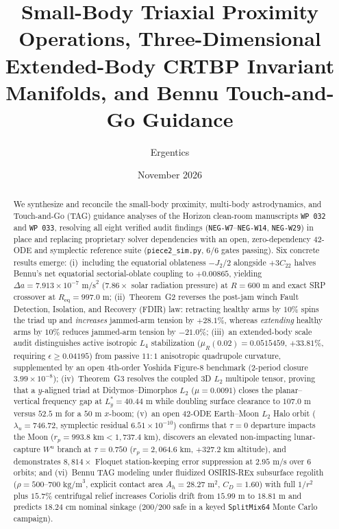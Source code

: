 \documentclass[11pt]{amsart}
\title[Small-Body Proximity, CRTBP Manifolds, and TAG Guidance]{Small-Body Triaxial Proximity Operations, Three-Dimensional Extended-Body CRTBP Invariant Manifolds, and Bennu Touch-and-Go Guidance}
\author{Ergentics}
\date{November 2026}
\numberwithin{equation}{section}
\theoremstyle{plain}
\theoremstyle{definition}\newtheorem{definition}[theorem]{Definition}
\theoremstyle{remark}\newtheorem{remark}[theorem]{Remark}
\begin{document}
\begin{abstract}
We synthesize and reconcile the small-body proximity, multi-body astrodynamics, and Touch-and-Go (TAG) guidance analyses of the Horizon clean-room manuscripts \texttt{WP~032} and \texttt{WP~033}, resolving all eight verified audit findings (\texttt{NEG-W7}--\texttt{NEG-W14}, \texttt{NEG-W29}) in place and replacing proprietary solver dependencies with an open, zero-dependency 42-ODE and symplectic reference suite (\texttt{piece2\_sim.py}, 6/6 gates passing). Six concrete results emerge: (i)~including the equatorial oblateness $-J_2/2$ alongside $+3C_{22}$ halves Bennu's net equatorial sectorial-oblate coupling to $+0.00865$, yielding $\Delta a = 7.913\times 10^{-7}\text{ m/s}^2$ ($7.86\times$ solar radiation pressure) at $R = 600\text{ m}$ and exact SRP crossover at $R_{\mathrm{eq}} = 997.0\text{ m}$; (ii)~Theorem~G2 reverses the post-jam winch Fault Detection, Isolation, and Recovery (FDIR) law: retracting healthy arms by $10\%$ spins the triad up and \emph{increases} jammed-arm tension by $+28.1\%$, whereas \emph{extending} healthy arms by $10\%$ reduces jammed-arm tension by $-21.0\%$; (iii)~an extended-body scale audit distinguishes active isotropic $L_4$ stabilization ($\mu_R(0.02) = 0.0515459$, $+33.81\%$, requiring $\epsilon \ge 0.04195$) from passive $11:1$ anisotropic quadrupole curvature, supplemented by an open 4th-order Yoshida Figure-8 benchmark (2-period closure $3.99\times 10^{-8}$); (iv)~Theorem~G3 resolves the coupled 3D $L_2$ multipole tensor, proving that a $y$-aligned triad at Didymos--Dimorphos $L_2$ ($\mu = 0.0091$) closes the planar--vertical frequency gap at $L_y^* = 40.44\text{ m}$ while doubling surface clearance to $107.0\text{ m}$ versus $52.5\text{ m}$ for a $50\text{ m}$ $x$-boom; (v)~an open 42-ODE Earth--Moon $L_2$ Halo orbit ($\lambda_u = 746.72$, symplectic residual $6.51\times 10^{-10}$) confirms that $\tau = 0$ departure impacts the Moon ($r_p = 993.8\text{ km} < 1{,}737.4\text{ km}$), discovers an elevated non-impacting lunar-capture $W^u$ branch at $\tau = 0.750$ ($r_p = 2{,}064.6\text{ km}$, $+327.2\text{ km}$ altitude), and demonstrates $8{,}814\times$ Floquet station-keeping error suppression at $2.95\text{ m/s}$ over 6 orbits; and (vi)~Bennu TAG modeling under fluidized OSIRIS-REx subsurface regolith ($\rho = 500$--$700\text{ kg/m}^3$, explicit contact area $A_h = 28.27\text{ m}^2$, $C_D = 1.60$) with full $1/r^2$ plus $15.7\%$ centrifugal relief increases Coriolis drift from $15.99\text{ m}$ to $18.81\text{ m}$ and predicts $18.24\text{ cm}$ nominal sinkage ($200/200$ safe in a keyed \texttt{SplitMix64} Monte Carlo campaign).
\end{abstract}
\maketitle
\end{document}
